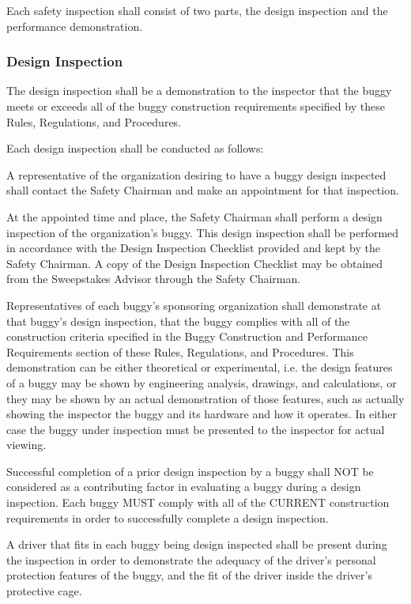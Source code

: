 Each safety inspection shall consist of two parts, the design inspection and the performance demonstration.

\subsubsection{Design Inspection}

The design inspection shall be a demonstration to the inspector that the buggy meets or exceeds all of the buggy construction requirements specified by these Rules, Regulations, and Procedures.

Each design inspection shall be conducted as follows:

A representative of the organization desiring to have a buggy design inspected shall contact the Safety Chairman and make an appointment for that inspection.

At the appointed time and place, the Safety Chairman shall perform a design inspection of the organization's buggy. This design inspection shall be performed in accordance with the Design Inspection Checklist provided and kept by the Safety Chairman. A copy of the Design Inspection Checklist may be obtained from the Sweepstakes Advisor through the Safety Chairman.

Representatives of each buggy's sponsoring organization shall demonstrate at that buggy's design inspection, that the buggy complies with all of the construction criteria specified in the Buggy Construction and Performance Requirements section of these Rules, Regulations, and Procedures. This demonstration can be either theoretical or experimental, i.e. the design features of a buggy may be shown by engineering analysis, drawings, and calculations, or they may be shown by an actual demonstration of those features, such as actually showing the inspector the buggy and its hardware and how it operates. In either case the buggy under inspection must be presented to the inspector for actual viewing.

Successful completion of a prior design inspection by a buggy shall NOT be considered as a contributing factor in evaluating a buggy during a design inspection. Each buggy MUST comply with all of the CURRENT construction requirements in order to successfully complete a design inspection.

A driver that fits in each buggy being design inspected shall be present during the inspection in order to demonstrate the adequacy of the driver's personal protection features of the buggy, and the fit of the driver inside the driver's protective cage.

